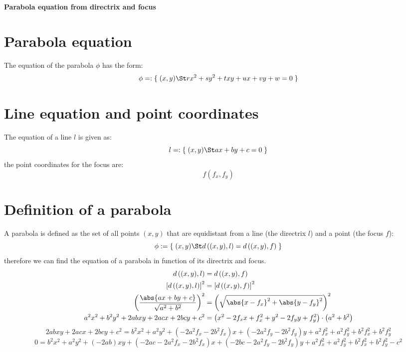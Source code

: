 \documentclass[11pt,a4paper,english]{article}
\begin{document}
    {\centering\huge\textbf{Parabola equation from directrix and focus}\par}

    \vspace{1cm}

    \section*{Parabola equation}
    The equation of the parabola \(\phi\) has the form:
    \[
    	\phi =: \{\;(x,y) \St rx^{2} + sy^{2} + txy + ux + vy + w = 0\;\}
    \]

    \section*{Line equation and point coordinates}
    The equation of a line \(l\) is given as:
    \[
    	l =: \{\;(x,y) \St ax + by + c = 0\;\}
    \]
    the point coordinates for the focus are:
    \[
    	f(f_{x},f_{y})
    \]

    \section*{Definition of a parabola}
    A parabola is defined as the set of all points \((x,y)\) that are equidistant from a line (the directrix \(l\)) and a point (the focus \(f\)):
    \[
    	\phi := \{\;(x,y) \St d\left((x,y),l\right) = d\left((x,y),f\right)\;\}
    \]
    therefore we can find the equation of a parabola in function of its directrix and focus.
    \begin{align*}
    d\left((x,y),l\right) &= d\left((x,y),f\right) \\
	\left[d\left((x,y),l\right)\right]^2 &= \left[d\left((x,y),f\right)\right]^2 \\
	\left(\frac{\abs{ax + by + c}}{\sqrt{a^{2} + b^{2}}}\right)^{2} &= \left(\sqrt{\abs{x - f_{x}}^{2} + \abs{y - f_{y}}^{2}}\right)^{2} \\
	a^{2}x^{2} + b^{2}y^{2} + 2abxy + 2acx + 2bcy + c^{2} &= \left(x^{2} - 2f_{x}x + f_{x}^{2} + y^{2} - 2f_{y}y + f_{y}^{2}\right) \cdot \left(a^{2} + b^{2}\right)
	\end{align*}
	\[
		2abxy + 2acx + 2bcy + c^{2} = b^{2}x^{2} + a^{2}y^{2} + (-2a^{2}f_{x}-2b^{2}f_{x})x + (-2a^{2}f_{y}-2b^{2}f_{y})y + a^{2}f_{x}^{2} + a^{2}f_{y}^{2} + b^{2}f_{x}^{2} + b^{2}f_{y}^{2}
	\]
	\[
		0 = b^{2}x^{2} + a^{2}y^{2} + (-2ab)xy + (-2ac-2a^{2}f_{x}-2b^{2}f_{x})x + (-2bc-2a^{2}f_{y}-2b^{2}f_{y})y + a^{2}f_{x}^{2} + a^{2}f_{y}^{2} + b^{2}f_{x}^{2} + b^{2}f_{y}^{2} - c^{2}
	\]
	\ppar\bigskip
\end{document}
